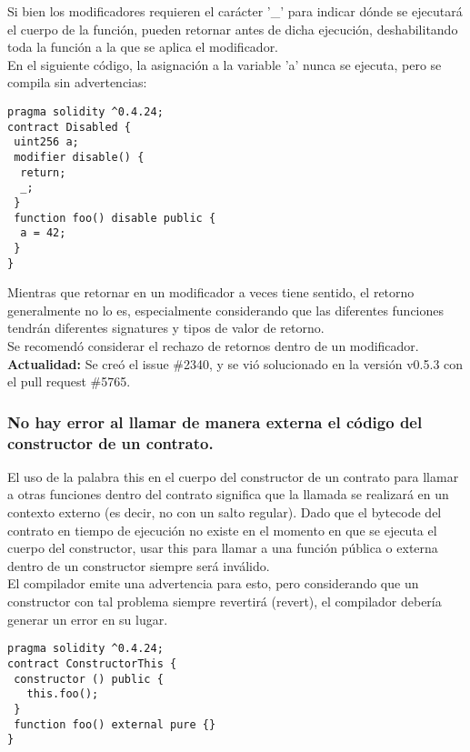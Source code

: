 Si bien los modificadores requieren el carácter '\_' para indicar dónde se ejecutará el cuerpo de la función, pueden retornar antes de dicha ejecución, deshabilitando toda la función a la que se aplica el modificador.\\

En el siguiente código, la asignación a la variable 'a' nunca se ejecuta, pero se compila sin advertencias:
\begin{lstlisting}[language=Solidity]
pragma solidity ^0.4.24;
contract Disabled {
 uint256 a;
 modifier disable() {
  return;
  _;
 }
 function foo() disable public {
  a = 42;
 }
}
\end{lstlisting}

Mientras que retornar en un modificador a veces tiene sentido, el retorno generalmente no lo es, especialmente considerando que las diferentes funciones tendrán diferentes signatures y tipos de valor de retorno.\\

Se recomendó considerar el rechazo de retornos dentro de un modificador.\\

\textbf{Actualidad:} Se creó el issue \#2340, y se vió solucionado en la versión v0.5.3 con el pull request \#5765.

\subsubsection{No hay error al llamar de manera externa el código del constructor de un contrato.}

El uso de la palabra this en el cuerpo del constructor de un contrato para llamar a otras funciones dentro del contrato significa que la llamada se realizará en un contexto externo (es decir, no con un salto regular). Dado que el bytecode del contrato en tiempo de ejecución no existe en el momento en que se ejecuta el cuerpo del constructor, usar this para llamar a una función pública o externa dentro de un constructor siempre será inválido.\\

El compilador emite una advertencia para esto, pero considerando que un constructor con tal problema siempre revertirá (revert), el compilador debería generar un error en su lugar.\\

\begin{lstlisting}[language=Solidity]
pragma solidity ^0.4.24;
contract ConstructorThis {
 constructor () public {
   this.foo();
 }
 function foo() external pure {}
}
\end{lstlisting}

